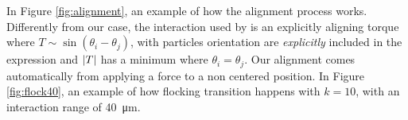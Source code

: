 \documentclass[../../master_thesis_np.tex]{subfiles}
\begin{document}
		In Figure \ref{fig:alignment}, an example of how the alignment process works. 
		Differently from our case, the interaction used by \citeauthor{martin-gomez_collective_2018} is an explicitly aligning torque where $T \sim \sin( \theta_{i}-\theta_{j} )$, with particles orientation are \emph{explicitly} included in the expression and $\abs{T}$ has a minimum where $\theta_{i} = \theta_{j}$. 
		Our alignment comes automatically from applying a force to a non centered position. 
		In Figure \ref{fig:flock40}, an example of how flocking transition happens with $k = 10$, with an interaction range of \SI{40}{\micro\meter}.
		\begin{figure}[htp]
			\centering
			\\
			\\
		\end{figure}
\end{document}
